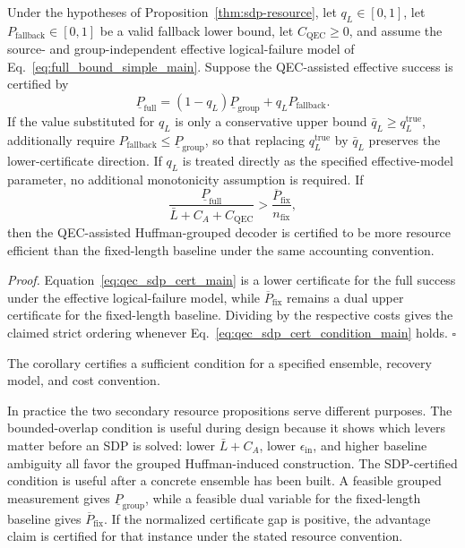 \begin{corollary}\label{cor:qec-sdp}
Under the hypotheses of Proposition~\ref{thm:sdp-resource}, let $q_L\in[0,1]$, let $P_{\mathrm{fallback}}\in[0,1]$ be a valid fallback lower bound, let $C_{\mathrm{QEC}}\ge0$, and assume the source- and group-independent effective logical-failure model of Eq.~\eqref{eq:full_bound_simple_main}. Suppose the QEC-assisted effective success is certified by
\begin{equation}
    \underline P_{\mathrm{full}}
    =
    (1-q_L)\underline P_{\mathrm{group}}
    +
    q_LP_{\mathrm{fallback}} .
    \label{eq:qec_sdp_cert_main}
\end{equation}
If the value substituted for \(q_L\) is only a conservative upper bound \(\bar q_L\ge q_L^{\mathrm{true}}\), additionally require \(P_{\mathrm{fallback}}\le\underline P_{\mathrm{group}}\), so that replacing \(q_L^{\mathrm{true}}\) by \(\bar q_L\) preserves the lower-certificate direction. If \(q_L\) is treated directly as the specified effective-model parameter, no additional monotonicity assumption is required.
If
\begin{equation}
    \frac{\underline P_{\mathrm{full}}}
    {\bar L+C_A+C_{\mathrm{QEC}}}
    >
    \frac{\overline P_{\mathrm{fix}}}{n_{\mathrm{fix}}},
    \label{eq:qec_sdp_cert_condition_main}
\end{equation}
then the QEC-assisted Huffman-grouped decoder is certified to be more resource efficient than the fixed-length baseline under the same accounting convention.
\end{corollary}
\textit{Proof.} Equation~\eqref{eq:qec_sdp_cert_main} is a lower certificate for the full success under the effective logical-failure model, while $\overline P_{\mathrm{fix}}$ remains a dual upper certificate for the fixed-length baseline. Dividing by the respective costs gives the claimed strict ordering whenever Eq.~\eqref{eq:qec_sdp_cert_condition_main} holds. \(\square\)

The corollary certifies a sufficient condition for a specified ensemble, recovery model, and cost convention.

In practice the two secondary resource propositions serve different purposes. The bounded-overlap condition is useful during design because it shows which levers matter before an SDP is solved: lower \(\bar L+C_A\), lower \(\epsilon_{\mathrm{in}}\), and higher baseline ambiguity all favor the grouped Huffman-induced construction. The SDP-certified condition is useful after a concrete ensemble has been built. A feasible grouped measurement gives \(\underline P_{\mathrm{group}}\), while a feasible dual variable for the fixed-length baseline gives \(\overline P_{\mathrm{fix}}\). If the normalized certificate gap is positive, the advantage claim is certified for that instance under the stated resource convention.

